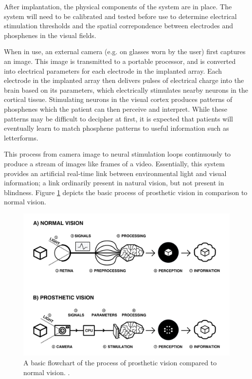 \documentclass[a4paper,11pt,openany]{book}
\begin{document}
After implantation, the physical components of the system are in place.
The system will need to be calibrated and tested before use to determine electrical stimulation thresholds and the spatial correpondence between electrodes and phosphenes in the visual fields. \cite{lowery_restoration_2015,fernandez_cortivis_2017}

When in use, an external camera (e.g. on glasses worn by the user) first captures an image. \cite{lowery_monash_2017,lewis_restoration_2015}
This image is transmitted to a portable processor, and is converted into electrical parameters for each electrode in the implanted array.
Each electrode in the implanted array then delivers pulses of electrical charge into the brain based on its parameters, which electrically stimulates nearby neurons in the cortical tissue.
Stimulating neurons in the visual cortex produces patterns of phosphenes which the patient can then perceive and interpret. \cite{brindley_sensations_1968,dobelle_phosphenes_1974,bak_visual_1990}
While these patterns may be difficult to decipher at first, it is expected that patients will eventually learn to match phosphene patterns to useful information such as letterforms. \cite{fernandez_cortivis_2017}

This process from camera image to neural stimulation loops continuously to produce a stream of images like frames of a video.
Essentially, this system provides an artificial real-time link between environmental light and visual information; a link ordinarily present in natural vision, but not present in blindness.
Figure \ref{fig:org1b6cb3b} depicts the basic process of prosthetic vision in comparison to normal vision.

\begin{figure}[htbp]
\centering
\includegraphics[angle=90,width=.9\linewidth]{./graphics/litreview/flowchart.png}
\caption[Basic flowchart of the process of prosthetic vision compared to normal vision]{\label{fig:org1b6cb3b}
A basic flowchart of the process of prosthetic vision compared to normal vision. .}
\end{figure}
\end{document}
